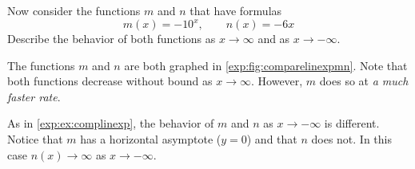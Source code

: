 \begin{pccexample}
	Now consider the functions $m$ and $n$ that have formulas
	\[
		m(x) = -10^x, \qquad n(x)=-6x
	\]
	Describe the behavior of both functions as $x\to\infty$ and as $x\to-\infty$.
	\begin{pccsolution}
		The functions $m$ and $n$ are both graphed in \cref{exp:fig:comparelinexpmn}. 
		Note that both functions decrease without bound as $x\to\infty$. However, $m$ does so 
		at \emph{a much faster rate}.
																	
		As in \cref{exp:ex:complinexp}, the behavior of $m$ and $n$ as $x\to-\infty$
		is different. Notice that $m$ has a horizontal asymptote ($y=0$) and that 
		$n$ does not.  In this case $n(x)\to \infty$ as $x\to-\infty$.
	\end{pccsolution}
\end{pccexample}
			
